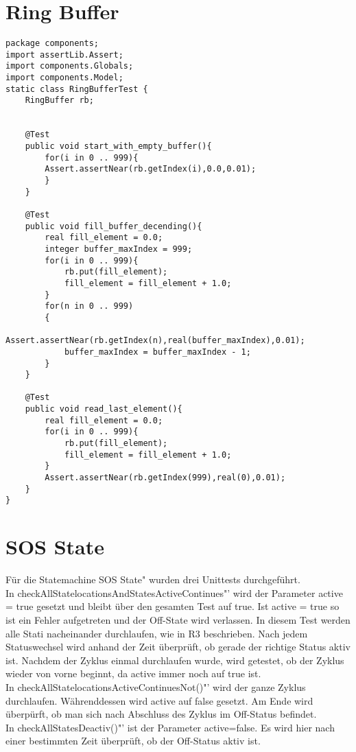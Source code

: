 \section{Ring Buffer}
\begin{lstlisting}
package components;
import assertLib.Assert;
import components.Globals;
import components.Model;
static class RingBufferTest {
	RingBuffer rb;
	
	
	@Test
	public void start_with_empty_buffer(){
		for(i in 0 .. 999){
		Assert.assertNear(rb.getIndex(i),0.0,0.01);
		}
	}
	
	@Test
	public void fill_buffer_decending(){
		real fill_element = 0.0;
		integer buffer_maxIndex = 999;
		for(i in 0 .. 999){
			rb.put(fill_element);
			fill_element = fill_element + 1.0;
		}
		for(n in 0 .. 999)
		{
			Assert.assertNear(rb.getIndex(n),real(buffer_maxIndex),0.01);
			buffer_maxIndex = buffer_maxIndex - 1;
		}
	}
	
	@Test
	public void read_last_element(){
		real fill_element = 0.0;
		for(i in 0 .. 999){
			rb.put(fill_element);
			fill_element = fill_element + 1.0;
		}
		Assert.assertNear(rb.getIndex(999),real(0),0.01);
	}
}
\end{lstlisting}

\section{SOS State}
Für die Statemachine \glqq SOS State" wurden drei Unittests durchgeführt.\\
In \glqq checkAllStatelocationsAndStatesActiveContinues"' wird der Parameter active = true gesetzt und bleibt über den gesamten Test auf true. Ist active = true so ist ein Fehler aufgetreten und der Off-State wird verlassen. In diesem Test werden alle Stati nacheinander durchlaufen, wie in R3 beschrieben. Nach jedem Statuswechsel wird anhand der Zeit überprüft, ob gerade der richtige Status aktiv ist. Nachdem der Zyklus einmal durchlaufen wurde, wird getestet, ob der Zyklus wieder von vorne beginnt, da active immer noch auf true ist.\\
In \glqq checkAllStatelocationsActiveContinuesNot()"' wird der ganze Zyklus durchlaufen. Währenddessen wird active auf false gesetzt. Am Ende wird überpürft, ob man sich nach Abschluss des Zyklus im Off-Status befindet.\\
In \glqq checkAllStatesDeactiv()"' ist der Parameter active=false. Es wird hier nach einer bestimmten Zeit überprüft, ob der Off-Status aktiv ist.

